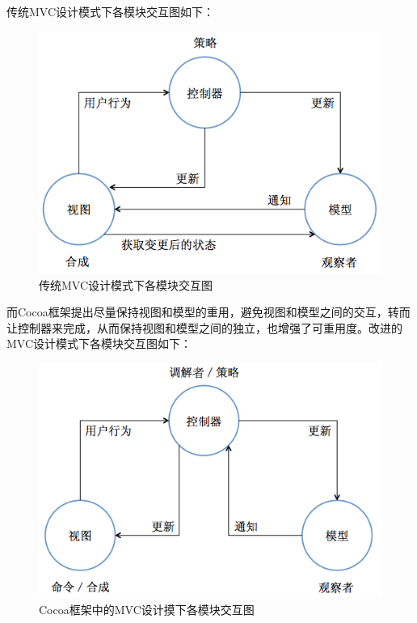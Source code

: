 \documentclass{article}
\begin{document}
\begin{CJK}{UTF8}{gbsn}
  传统MVC设计模式下各模块交互图如下：

  \begin{figure}[htbp]
		\centering
		\includegraphics[bb=0 0 548 341, scale=0.45]{figure/fig_n01.png}
		\caption{传统MVC设计模式下各模块交互图}
		\label{fig:n01}
	\end{figure}

  而Cocoa框架提出尽量保持视图和模型的重用，避免视图和模型之间的交互，转而让控制器来完成，从而保持视图和模型之间的独立，也增强了可重用度。改进的MVC设计模式下各模块交互图如下：

  \begin{figure}[htbp]
		\centering
		\includegraphics[bb=0 0 548 341, scale=0.45]{figure/fig_n02.png}
		\caption{Cocoa框架中的MVC设计摸下各模块交互图}
		\label{fig:n02}
	\end{figure}


\end{CJK}
\end{document}
